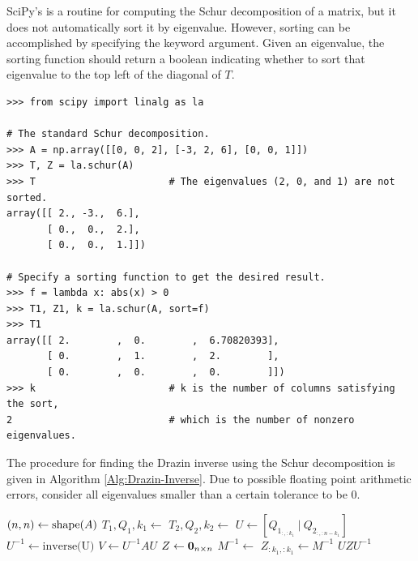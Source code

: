 SciPy's  is a routine for computing the Schur decomposition of a matrix, but it does not automatically sort it by eigenvalue.
However, sorting can be accomplished by specifying the  keyword argument.
Given an eigenvalue, the sorting function should return a boolean indicating whether to sort that eigenvalue to the top left of the diagonal of $T$.


\begin{lstlisting}
>>> from scipy import linalg as la

# The standard Schur decomposition.
>>> A = np.array([[0, 0, 2], [-3, 2, 6], [0, 0, 1]])
>>> T, Z = la.schur(A)
>>> T                       # The eigenvalues (2, 0, and 1) are not sorted.
array([[ 2., -3.,  6.],
       [ 0.,  0.,  2.],
       [ 0.,  0.,  1.]])

# Specify a sorting function to get the desired result.
>>> f = lambda x: abs(x) > 0
>>> T1, Z1, k = la.schur(A, sort=f)
>>> T1
array([[ 2.        ,  0.        ,  6.70820393],
       [ 0.        ,  1.        ,  2.        ],
       [ 0.        ,  0.        ,  0.        ]])
>>> k                       # k is the number of columns satisfying the sort,
2                           # which is the number of nonzero eigenvalues.
\end{lstlisting}

The procedure for finding the Drazin inverse using the Schur decomposition is given in Algorithm \ref{Alg:Drazin-Inverse}.
Due to possible floating point arithmetic errors, consider all eigenvalues smaller than a certain tolerance to be $0$.

\begin{algorithm}[H]
\begin{algorithmic}[1]
    \State $(n,n) \gets \mathrm{shape}(A)$
    \State $T_1,Q_1,k_1 \gets $ 
    \State $T_2,Q_2,k_2 \gets $ 
    \State $U \gets [Q_{1_{:,:k_1}}\ |\ Q_{2_{:,:n - k_1}}]$
    \State $U^{-1} \gets \text{inverse(U)}$
    \State $V \gets U^{-1}AU$
    \State $Z \gets \mathbf{0}_{n\times n}$
        \State $M^{-1} \gets $ 
        \State $Z_{:k_1,:k_1} \gets M^{-1}$
    \EndIf
    \State {} $UZU^{-1}$
\EndProcedure
\end{algorithmic}
\caption{}
\label{Alg:Drazin-Inverse}
\end{algorithm}

